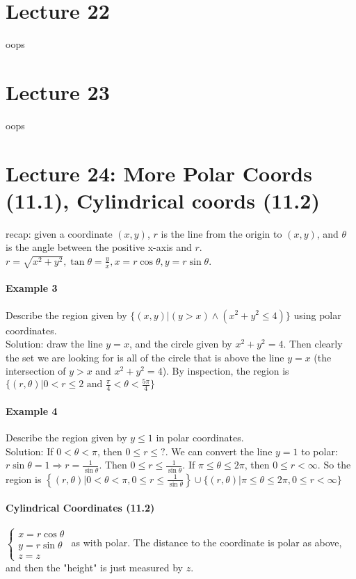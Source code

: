 \documentclass[tikz,10pt,letter]{article}
\theoremstyle{plain}
\theoremstyle{definition}
\begin{document}
\section*{Lecture 22}
oops
\section*{Lecture 23}
oops

\section*{Lecture 24: More Polar Coords (11.1), Cylindrical coords (11.2)}
recap: given a coordinate $(x,y)$, $r$ is the line from the origin to $(x,y)$, and $\theta$ is the angle between the positive x-axis and $r$. $r=\sqrt{x^2+y^2},\tan\theta=\frac{y}{x},x=r\cos\theta,y=r\sin\theta$. 
\paragraph{Example 3}
Describe the region given by $\lbrace(x,y)|(y>x)\wedge( x^2+y^2\leq4)\rbrace$ using polar coordinates. \\ 
Solution: draw the line $y=x$, and the circle given by $x^2+y^2=4$. Then clearly the set we are looking for is all of the circle that is above the line $y=x$ (the intersection of $y>x$ and $x^2+y^2=4$). By inspection, the region is $\lbrace(r,\theta)|0<r\leq2\text{ and }\frac{\pi}{4}<\theta<\frac{5\pi}{4}\rbrace$
\paragraph{Example 4}
Describe the region given by $y\leq1$ in polar coordinates. \\ 
Solution: If $0<\theta<\pi$, then $0\leq r\leq ?$. We can convert the line $y=1$ to polar: $r\sin\theta=1\Rightarrow r=\frac{1}{\sin\theta}$. Then $0\leq r\leq\frac{1}{\sin\theta}$. If $\pi\leq\theta\leq 2\pi$, then $0\leq r<\infty$. So the region is $\left\lbrace(r,\theta)|0<\theta<\pi,0\leq r\leq\frac{1}{\sin\theta}\right\rbrace\cup\bigg\lbrace(r,\theta)|\pi\leq\theta\leq2\pi,0\leq r<\infty\bigg\rbrace$

\paragraph{Cylindrical Coordinates (11.2)}
$\begin{cases}x=r\cos\theta\\y=r\sin\theta\\z=z\end{cases}$ as with polar. The distance to the coordinate is polar as above, and then the "height" is just measured by $z$. 
\end{document}
